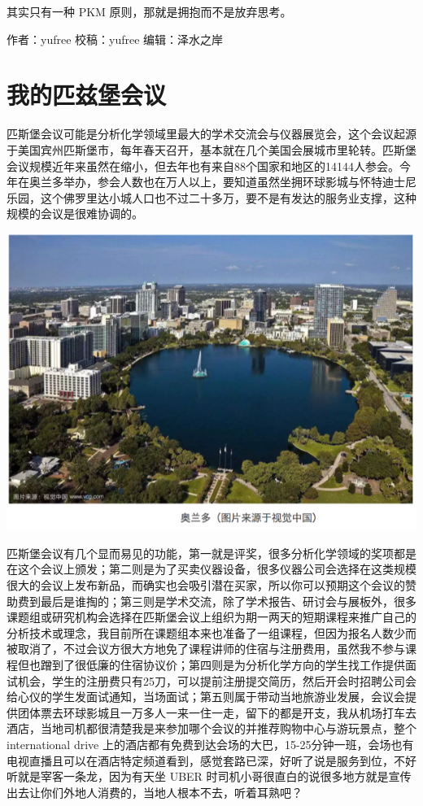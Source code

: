 \documentclass[]{book}
\begin{document}
其实只有一种 PKM 原则，那就是拥抱而不是放弃思考。

作者：yufree
校稿：yufree
编辑：泽水之岸

\hypertarget{ux6211ux7684ux5339ux5179ux5821ux4f1aux8bae}{%
\section{我的匹兹堡会议}\label{ux6211ux7684ux5339ux5179ux5821ux4f1aux8bae}}

匹斯堡会议可能是分析化学领域里最大的学术交流会与仪器展览会，这个会议起源于美国宾州匹斯堡市，每年春天召开，基本就在几个美国会展城市里轮转。匹斯堡会议规模近年来虽然在缩小，但去年也有来自88个国家和地区的14144人参会。今年在奥兰多举办，参会人数也在万人以上，要知道虽然坐拥环球影城与怀特迪士尼乐园，这个佛罗里达小城人口也不过二十多万，要不是有发达的服务业支撑，这种规模的会议是很难协调的。

\includegraphics[width=8.33in]{images/pittcon1}

匹斯堡会议有几个显而易见的功能，第一就是评奖，很多分析化学领域的奖项都是在这个会议上颁发；第二则是为了买卖仪器设备，很多仪器公司会选择在这类规模很大的会议上发布新品，而确实也会吸引潜在买家，所以你可以预期这个会议的赞助费到最后是谁掏的；第三则是学术交流，除了学术报告、研讨会与展板外，很多课题组或研究机构会选择在匹斯堡会议上组织为期一两天的短期课程来推广自己的分析技术或理念，我目前所在课题组本来也准备了一组课程，但因为报名人数少而被取消了，不过会议方很大方地免了课程讲师的住宿与注册费用，虽然我不参与课程但也蹭到了很低廉的住宿协议价；第四则是为分析化学方向的学生找工作提供面试机会，学生的注册费只有25刀，可以提前注册提交简历，然后开会时招聘公司会给心仪的学生发面试通知，当场面试；第五则属于带动当地旅游业发展，会议会提供团体票去环球影城且一万多人一来一住一走，留下的都是开支，我从机场打车去酒店，当地司机都很清楚我是来参加哪个会议的并推荐购物中心与游玩景点，整个 international drive 上的酒店都有免费到达会场的大巴，15-25分钟一班，会场也有电视直播且可以在酒店特定频道看到，感觉套路已深，好听了说是服务到位，不好听就是宰客一条龙，因为有天坐 UBER 时司机小哥很直白的说很多地方就是宣传出去让你们外地人消费的，当地人根本不去，听着耳熟吧？
\end{document}
